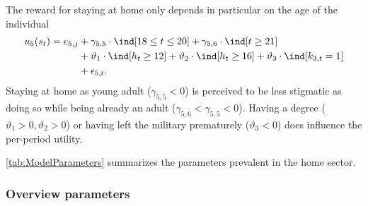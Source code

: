 \FloatBarrier{}
The reward for staying at home only depends in particular on the age of the individual
%
\begin{align}
    u_5(s_t) =  e_{5,j} & + \gamma_{5,5} \cdot \ind[18 \leq t \leq 20] + \gamma_{5,6} \cdot \ind[t \geq 21] \nonumber \\
    							   & +\vartheta_{1} \cdot \ind[h_t \geq 12] + \vartheta_{2} \cdot \ind[h_t \geq 16] +  \vartheta_3 \cdot \ind[k_{3,t} = 1]  \nonumber \\
    							   & + \epsilon_{5,t}.
\end{align}
%
Staying at home as young adult ($\gamma_{5, 5} < 0$) is perceived to be less stigmatic as doing so while being already an adult ($\gamma_{5,6} < \gamma_{5, 5} <0$). Having a degree  ($\vartheta_1 > 0, \vartheta_2 > 0$) or having left the military prematurely  ($\vartheta_3 <0$) does influence the per-period utility.

\autoref{tab:ModelParameters} summarizes the parameters prevalent in the home sector.


\FloatBarrier\subsubsection{Overview parameters}


